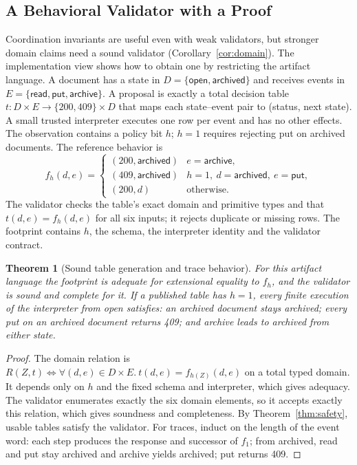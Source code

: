 \documentclass[10pt,journal,compsoc]{IEEEtran}
\theoremstyle{plain}
\newtheorem{theorem}{Theorem}
\theoremstyle{definition}
\begin{document}
\subsection{A Behavioral Validator with a Proof}\label{sec:discharged}
Coordination invariants are useful even with weak validators, but stronger domain claims need a sound validator (Corollary~\ref{cor:domain}). The implementation view shows how to obtain one by restricting the artifact language. A document has a state in $D=\{\mathsf{open},\mathsf{archived}\}$ and receives events in $E=\{\mathsf{read},\mathsf{put},\mathsf{archive}\}$. A proposal is exactly a total decision table $t:D\times E\to\{200,409\}\times D$ that maps each state--event pair to (status, next state). A small trusted interpreter executes one row per event and has no other effects. The observation contains a policy bit $h$; $h=1$ requires rejecting \textsf{put} on archived documents. The reference behavior is
\begin{equation}\label{eq:reference}
f_h(d,e)=\begin{cases}
(200,\mathsf{archived}) & e=\mathsf{archive},\\
(409,\mathsf{archived}) & h=1,\ d=\mathsf{archived},\ e=\mathsf{put},\\
(200,d) & \text{otherwise}.
\end{cases}
\end{equation}
The validator checks the table's exact domain and primitive types and that $t(d,e)=f_h(d,e)$ for all six inputs; it rejects duplicate or missing rows. The footprint contains $h$, the schema, the interpreter identity and the validator contract.

\begin{theorem}[Sound table generation and trace behavior]\label{thm:table}
For this artifact language the footprint is adequate for extensional equality to $f_h$, and the validator is sound and complete for it. If a published table has $h=1$, every finite execution of the interpreter from \textsf{open} satisfies: an archived document stays archived; every \textsf{put} on an archived document returns 409; and \textsf{archive} leads to archived from either state.
\end{theorem}
\begin{proof}
The domain relation is $R(Z,t)\iff\forall(d,e)\in D\times E.\ t(d,e)=f_{h(Z)}(d,e)$ on a total typed domain. It depends only on $h$ and the fixed schema and interpreter, which gives adequacy. The validator enumerates exactly the six domain elements, so it accepts exactly this relation, which gives soundness and completeness. By Theorem~\ref{thm:safety}, usable tables satisfy the validator. For traces, induct on the length of the event word: each step produces the response and successor of $f_1$; from archived, \textsf{read} and \textsf{put} stay archived and \textsf{archive} yields archived; \textsf{put} returns 409.
\end{proof}
\end{document}
